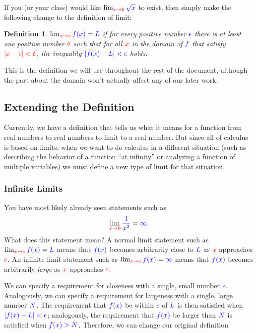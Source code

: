 \documentclass{myarticle}
\newcommand{\hor}[1]{\textcolor{red}{#1}}
\newcommand{\ver}[1]{\textcolor{blue}{#1}}
\theoremstyle{nospace}
\newtheorem*{oldattempt}{Definition}
\newenvironment{attempt}
{\begin{mdframed}\begin{oldattempt}}
    {\end{oldattempt}\end{mdframed}}
\newtheorem{old series theorem}{Theorem}
\newenvironment{series theorem}
{\begin{mdframed}\begin{old series theorem}}
    {\end{old series theorem}\end{mdframed}}
\begin{document}
If you (or your class) would like
$\lim_{\hor{x \to 0}} \ver{\sqrt{x}}$ to exist, then simply make the
following change to the definition of limit:

\begin{attempt}
  $\lim_{\hor{x \to c}} \ver{f(x)} = \ver{L}$ if for every positive
  number $\ver{\epsilon}$ there is at least one positive number
  $\hor{\delta}$ such that for all $\hor{x}$ in the domain of
  $\ver{f}$ that satisfy $\hor{|x - c| < \delta}$, the inequality
  $\ver{|f(x) - L| < \epsilon}$ holds.
\end{attempt}

This is the definition we will use throughout the rest of the
document, although the part about the domain won't actually affect any
of our later work.

\subsection{Extending the Definition}
\label{sec:extending limit definition}

Currently, we have a definition that tells us what it means for a
function from real numbers to real numbers to limit to a real number.
But since all of calculus is based on limits, when we want to do
calculus in a different situation (such as describing the behavior of
a function ``at infinity'' or analyzing a function of multiple
variables) we must define a new type of limit for that situation.

\subsubsection{Infinite Limits}
\label{sec:infinite limits}

You have most likely already seen statements such as
\[
  \lim_{\hor{x \to 0}} \ver{\frac{1}{x^2}} = \ver{\infty}.
\]
What does this statement mean? A normal limit statement such as
$\lim_{\hor{x \to c}} \ver{f(x)} = \ver{L}$ means that $\ver{f(x)}$
becomes arbitrarily close to $\ver{L}$ as $\hor{x}$ approaches
$\hor{c}$. An infinite limit statement such as
$\lim_{\hor{x \to c}} \ver{f(x)} = \ver{\infty}$ means that
$\ver{f(x)}$ becomes arbitrarily \emph{large} as $\hor{x}$ approaches
$\hor{c}$.

We can specify a requirement for closeness with a single, small number
$\ver{\epsilon}$. Analogously, we can specify a requirement for
largeness with a single, large number $\ver{N}$. The requirement that
$\ver{f(x)}$ be within $\ver{\epsilon}$ of $\ver{L}$ is then satisfied
when $\ver{|f(x) - L| < \epsilon}$; analogously, the requirement that
$\ver{f(x)}$ be larger than $\ver{N}$ is satisfied when
$\ver{f(x) > N}$. Therefore, we can change our original definition
\end{document}
